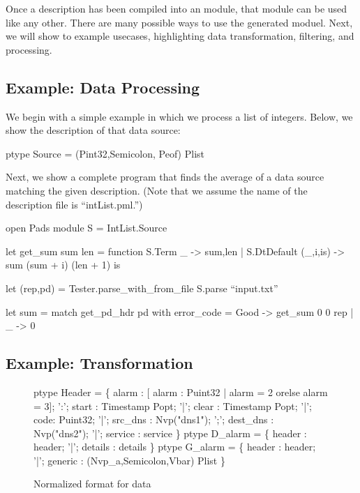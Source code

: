 Once a description has been compiled into an \ocaml{} module, that
module can be used like any other. There are many possible ways to use
the generated moduel. Next, we will show to example usecases,
highlighting data transformation, filtering, and processing.

\subsection{Example: Data Processing}
\label{sec:ex-process}

We begin with a simple example in which we process a list of
integers. Below, we show the description of that data source:
\begin{code}\scriptsize
ptype Source = (Pint32,Semicolon, Peof) Plist\end{code}
Next, we show a complete \ocaml program that finds the average of a
data source matching the given description. (Note that we assume the
name of the description file is ``intList.pml.'')
\begin{code}\scriptsize
open Pads
module S = IntList.Source

let get_sum sum len = function
  S.Term _ -> sum,len
| S.DtDefault (_,i,is) -> sum (sum + i) (len + 1) is
  
let (rep,pd) = Tester.parse_with_from_file S.parse ``input.txt''

let sum = match get_pd_hdr pd with
            {error_code = Good} -> get_sum 0 0 rep
          | _ -> 0\end{code}

\subsection{Example: Transformation}
\label{sec:ex-trans}

\begin{figure}
  \centering
  \begin{code}\scriptsize
ptype Header = \{
       alarm : [ alarm : Puint32 | alarm = 2 
                                    orelse alarm = 3];
 ':';  start :  Timestamp Popt;
 '|';  clear :  Timestamp Popt;
 '|';  code: Puint32;
 '|';  src\_dns  :  Nvp("dns1");
 ';';  dest\_dns :  Nvp("dns2");
 '|';  service  : service
\}
\mbox{}
ptype D\_alarm = \{
       header   : header;
 '|';  details  : details
 \}
\mbox{}
ptype G\_alarm = \{
       header   : header;
 '|';  generic  : (Nvp\_a,Semicolon,Vbar) Plist
\}\end{code}
\caption{Normalized format for \darkstar{} data}
\label{fig:normal-darkstar}
\end{figure}

